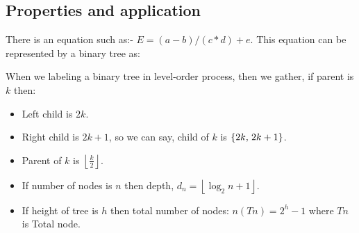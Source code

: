 \documentclass[10 pt]{article}
\begin{document}
\subsection{Properties and application}
There is an equation such as:- $E = (a-b) / (c * d) + e$. This equation can be represented by a binary tree as:\\
\begin{center}
\end{center}

When we labeling a binary tree in level-order process, then we gather, if parent is $k$ then:
\begin{itemize}
	\item Left child is $2k$.
	\item Right child is $2k+1$, so we can say, child of $k$ is $\{2k,\hspace{0.5mm}2k+1\}$.
	\item Parent of $k$ is $\left\lfloor\frac{k}{2}\right\rfloor$.
	\item If number of nodes is $n$ then depth, $d_n = \left\lfloor\log_2n+1\right\rfloor$.
	\item If height of tree is $h$ then total number of nodes: $n(Tn) = 2^h-1$ where $Tn$ is Total node.
\end{itemize}
\end{document}
